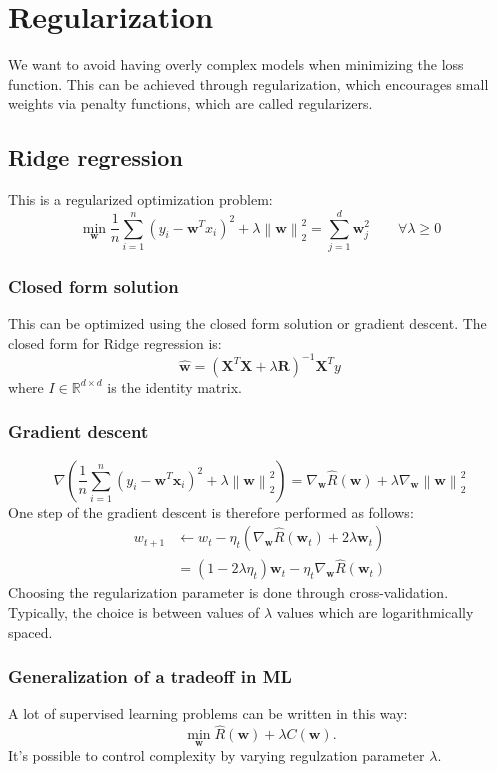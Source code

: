 \documentclass[a4paper,10pt,twoside]{article}
\newcommand\norm[1]{\left\lVert#1\right\rVert}
\begin{document}
\section{Regularization}
We want to avoid having overly complex models when minimizing the loss function. This can be achieved through regularization, which encourages small weights via penalty functions, which are called regularizers.

\subsection{Ridge regression}
This is a regularized optimization problem:
\begin{equation*}
    \min_{\mathbf{w}}\frac{1}{n}\sum_{i=1}^{n}(y_i-\mathbf{w}^Tx_i)^2+\lambda\norm{\mathbf{w}}^{2}_{2}=\sum_{j=1}^{d}\mathbf{w}_j^2\qquad\forall\lambda\geq 0
\end{equation*}
\subsubsection{Closed form solution}
This can be optimized using the closed form solution or gradient descent. The closed form for Ridge regression is:
\begin{equation*}
    \mathbf{\hat{w}}=(\mathbf{X}^T\mathbf{X}+\lambda\mathbf{R})^{-1}\mathbf{X}^Ty
\end{equation*}
where $I\in\mathbb{R}^{d\times d}$ is the identity matrix.
\subsubsection{Gradient descent}
\begin{equation*}
    \nabla\left(\frac{1}{n}\sum_{i=1}^{n}(y_i-\mathbf{w}^T\mathbf{x}_i)^2 + \lambda\norm{\mathbf{w}}^{2}_{2}\right) = \nabla_{\mathbf{w}}\hat{R}(\mathbf{w})+\lambda \nabla_{\mathbf{w}}\norm{\mathbf{w}}^{2}_{2}
\end{equation*}
One step of the gradient descent is therefore performed as follows:
\begin{align*}
    w_{t+1}&\leftarrow w_t-\eta_t(\nabla_{\mathbf{w}}\hat{R}(\mathbf{w}_t)+2\lambda\mathbf{w}_t)\\
    &=(1-2\lambda\eta_t)\mathbf{w}_t-\eta_t\nabla_{\mathbf{w}}\hat{R}(\mathbf{w}_t)
\end{align*}
Choosing the regularization parameter is done through cross-validation. Typically, the choice is between values of $\lambda$ values which are logarithmically spaced.
\subsubsection{Generalization of a tradeoff in ML}
A lot of supervised learning problems can be written in this way:
\begin{equation*}
    \min_{\mathbf{w}}\hat{R}(\mathbf{w})+\lambda C(\mathbf{w}).
\end{equation*}
It's possible to control complexity by varying regulzation parameter $\lambda$. 
\end{document}
